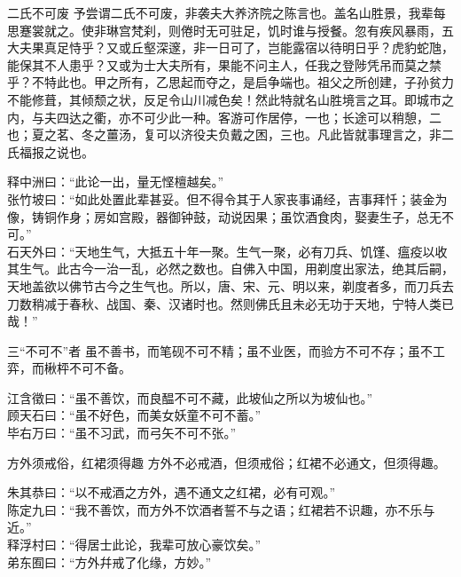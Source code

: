\begin{yulu}{二氏不可废}
予尝谓二氏不可废，非袭夫大养济院之陈言也。盖名山胜景，我辈每思蹇裳就之。使非琳宫梵刹，则倦时无可驻足，饥时谁与授餐。忽有疾风暴雨，五大夫果真足恃乎？又或丘壑深邃，非一日可了，岂能露宿以待明日乎？虎豹蛇虺，能保其不人患乎？又或为士大夫所有，果能不问主人，任我之登陟凭吊而莫之禁乎？不特此也。甲之所有，乙思起而夺之，是启争端也。祖父之所创建，子孙贫力不能修葺，其倾颓之状，反足令山川减色矣！然此特就名山胜境言之耳。即城市之内，与夫四达之衢，亦不可少此一种。客游可作居停，一也；长途可以稍憩，二也；夏之茗、冬之薑汤，复可以济役夫负戴之困，三也。凡此皆就事理言之，非二氏福报之说也。
\begin{comments}
释中洲曰：“此论一出，量无悭檀越矣。” \\
张竹坡曰：“如此处置此辈甚妥。但不得令其于人家丧事诵经，吉事拜忏；装金为像，铸铜作身；房如宫殿，器御钟鼓，动说因果；虽饮酒食肉，娶妻生子，总无不可。” \\
石天外曰：“天地生气，大抵五十年一聚。生气一聚，必有刀兵、饥馑、瘟疫以收其生气。此古今一治一乱，必然之数也。自佛入中国，用剃度出家法，绝其后嗣，天地盖欲以佛节古今之生气也。所以，唐、宋、元、明以来，剃度者多，而刀兵去刀数稍减于春秋、战国、秦、汉诸时也。然则佛氏且未必无功于天地，宁特人类已哉！”
\end{comments}
\end{yulu}

\begin{yulu}{三“不可不”者}
虽不善书，而笔砚不可不精；虽不业医，而验方不可不存；虽不工弈，而楸枰不可不备。
\begin{comments}
江含徵曰：“虽不善饮，而良醖不可不藏，此坡仙之所以为坡仙也。” \\
顾天石曰：“虽不好色，而美女妖童不可不蓄。” \\
毕右万曰：“虽不习武，而弓矢不可不张。”
\end{comments}
\end{yulu}

\begin{yulu}{方外须戒俗，红裙须得趣}
方外不必戒酒，但须戒俗；红裙不必通文，但须得趣。
\begin{comments}
朱其恭曰：“以不戒酒之方外，遇不通文之红裙，必有可观。” \\
陈定九曰：“我不善饮，而方外不饮酒者誓不与之语；红裙若不识趣，亦不乐与近。” \\
释浮村曰：“得居士此论，我辈可放心豪饮矣。” \\
弟东囿曰：“方外幷戒了化缘，方妙。”
\end{comments}
\end{yulu}

